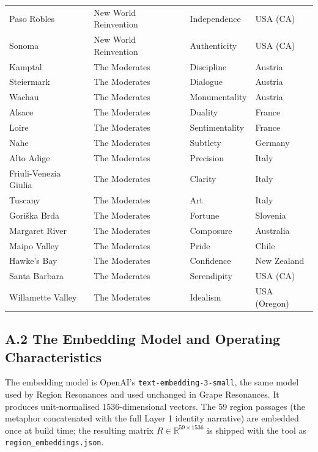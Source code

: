\documentclass[11pt]{article}
\providecommand{\R}{\mathbb{R}}
\begin{document}
\begin{small}
\begin{longtable}{p{4.5cm} p{4cm} p{3cm} p{3cm}}
Paso Robles              & New World Reinvention   & Independence   & USA (CA) \\
Sonoma                   & New World Reinvention   & Authenticity   & USA (CA) \\
\midrule
Kamptal                  & The Moderates           & Discipline     & Austria \\
Steiermark               & The Moderates           & Dialogue       & Austria \\
Wachau                   & The Moderates           & Monumentality  & Austria \\
Alsace                   & The Moderates           & Duality        & France \\
Loire                    & The Moderates           & Sentimentality & France \\
Nahe                     & The Moderates           & Subtlety       & Germany \\
Alto Adige               & The Moderates           & Precision      & Italy \\
Friuli-Venezia Giulia    & The Moderates           & Clarity        & Italy \\
Tuscany                  & The Moderates           & Art            & Italy \\
Gori\v{s}ka Brda         & The Moderates           & Fortune        & Slovenia \\
Margaret River           & The Moderates           & Composure      & Australia \\
Maipo Valley             & The Moderates           & Pride          & Chile \\
Hawke's Bay              & The Moderates           & Confidence     & New Zealand \\
Santa Barbara            & The Moderates           & Serendipity    & USA (CA) \\
Willamette Valley        & The Moderates           & Idealism       & USA (Oregon) \\
\bottomrule
\end{longtable}
\end{small}

\subsection*{A.2 The Embedding Model and Operating Characteristics}

The embedding model is OpenAI's \texttt{text-embedding-3-small}, the same model used by Region Resonances and used unchanged in Grape Resonances. It produces unit-normalised 1536-dimensional vectors. The 59 region passages (the metaphor concatenated with the full Layer 1 identity narrative) are embedded once at build time; the resulting matrix $R \in \R^{59 \times 1536}$ is shipped with the tool as \texttt{region\_embeddings.json}.
\end{document}
